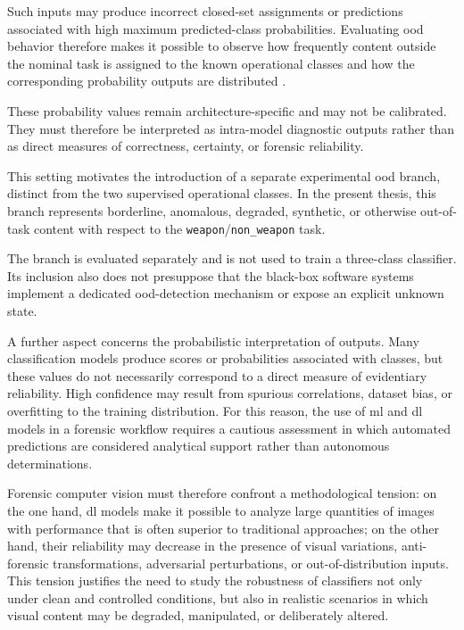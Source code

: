 Such inputs may produce incorrect closed-set assignments or predictions
associated with high maximum predicted-class probabilities. Evaluating
\gls{ood} behavior therefore makes it possible to observe how frequently
content outside the nominal task is assigned to the known operational classes
and how the corresponding probability outputs are distributed
\cite{hendrycks2017baseline,fort2021exploring}.

These probability values remain architecture-specific and may not be
calibrated. They must therefore be interpreted as intra-model diagnostic
outputs rather than as direct measures of correctness, certainty, or forensic
reliability.

This setting motivates the introduction of a separate experimental
\gls{ood} branch, distinct from the two supervised operational classes. In the
present thesis, this branch represents borderline, anomalous, degraded,
synthetic, or otherwise out-of-task content with respect to the
\texttt{weapon}/\texttt{non\_weapon} task.

The branch is evaluated separately and is not used to train a three-class
classifier. Its inclusion also does not presuppose that the black-box software
systems implement a dedicated \gls{ood}-detection mechanism or expose an
explicit unknown state.




A further aspect concerns the probabilistic interpretation of outputs. Many
classification models produce scores or probabilities associated with classes,
but these values do not necessarily correspond to a direct measure of
evidentiary reliability. High confidence may result from spurious correlations,
dataset bias, or overfitting to the training distribution. For this reason, the
use of \gls{ml} and \gls{dl} models in a forensic workflow requires a cautious
assessment in which automated predictions are considered analytical support
rather than autonomous determinations.

Forensic computer vision must therefore confront a methodological tension: on
the one hand, \gls{dl} models make it possible to analyze large quantities of
images with performance that is often superior to traditional approaches; on
the other hand, their reliability may decrease in the presence of visual
variations, anti-forensic transformations, adversarial perturbations, or
out-of-distribution inputs. This tension justifies the need to study the
robustness of classifiers not only under clean and controlled conditions, but
also in realistic scenarios in which visual content may be degraded,
manipulated, or deliberately altered.

